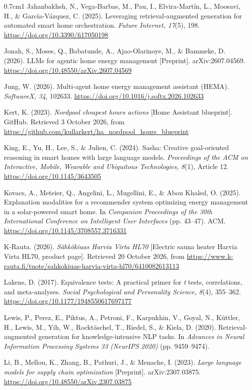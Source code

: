 \documentclass[12pt,a4paper]{report}
\begin{document}
\begin{hangparas}{0.7cm}{1}
Jahanbakhsh, N., Vega-Barbas, M., Pau, I., Elvira-Martín, L., Moosavi,
H., \& García-Vázquez, C. (2025). Leveraging retrieval-augmented
generation for automated smart home orchestration. \textit{Future
Internet, 17}(5), 198. \url{https://doi.org/10.3390/fi17050198}

Jonah, S., Moses, Q., Babatunde, A., Ajao-Olarinoye, M., \& Bammeke, D.
(2026). LLMs for agentic home energy management [Preprint].
arXiv:2607.04569. \url{https://doi.org/10.48550/arXiv.2607.04569}

Jung, W. (2026). Multi-agent home energy management assistant (HEMA).
\textit{SoftwareX, 34}, 102633.
\url{https://doi.org/10.1016/j.softx.2026.102633}

Kert, K. (2023). \textit{Nordpool cheapest hours actions} [Home Assistant
blueprint]. GitHub. Retrieved 3 October 2026, from
\url{https://github.com/kullarkert/ha_nordpool_hours_blueprint}

King, E., Yu, H., Lee, S., \& Julien, C. (2024). Sasha: Creative
goal-oriented reasoning in smart homes with large language models.
\textit{Proceedings of the ACM on Interactive, Mobile, Wearable and
Ubiquitous Technologies, 8}(1), Article 12.
\url{https://doi.org/10.1145/3643505}

Kovacs, A., Meteier, Q., Angelini, L., Mugellini, E., \& Abou Khaled, O.
(2025). Explanation modalities for a recommender system optimizing
energy management in a solar-powered smart home. In \textit{Companion
Proceedings of the 30th International Conference on Intelligent User
Interfaces} (pp. 43--47). ACM.
\url{https://doi.org/10.1145/3708557.3716331}

K-Rauta. (2026). \textit{Sähkökiuas Harvia Virta HL70} [Electric sauna
heater Harvia Virta HL70, product page]. Retrieved 20 October 2026, from
\url{https://www.k-rauta.fi/tuote/sahkokiuas-harvia-virta-hl70/6410082613113}

Lakens, D. (2017). Equivalence tests: A practical primer for \textit{t}
tests, correlations, and meta-analyses. \textit{Social Psychological and
Personality Science, 8}(4), 355--362.
\url{https://doi.org/10.1177/1948550617697177}

Lewis, P., Perez, E., Piktus, A., Petroni, F., Karpukhin, V., Goyal, N.,
Küttler, H., Lewis, M., Yih, W., Rocktäschel, T., Riedel, S., \& Kiela,
D. (2020). Retrieval-augmented generation for knowledge-intensive NLP
tasks. In \textit{Advances in Neural Information Processing Systems 33
(NeurIPS 2020)} (pp. 9459--9474).

Li, B., Mellou, K., Zhang, B., Pathuri, J., \& Menache, I. (2023).
\textit{Large language models for supply chain optimization}
[Preprint]. arXiv:2307.03875.
\url{https://doi.org/10.48550/arXiv.2307.03875}


\end{hangparas}
\end{document}
